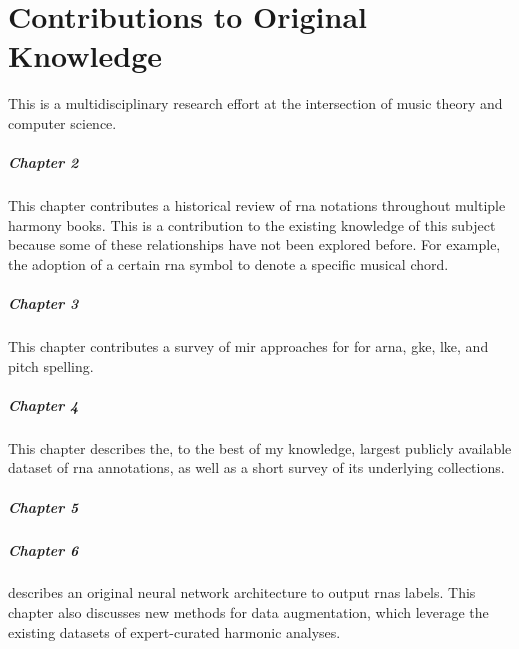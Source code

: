 \chapter*{Contributions to Original Knowledge}
\label{chap:contributionstoknowledge}

This \thesisdiss{} is a multidisciplinary research effort at
the intersection of music theory and computer science.

\paragraph{Chapter 2}

This chapter contributes a historical review of \gls{rna}
notations throughout multiple harmony books. This is a
contribution to the existing knowledge of this subject
because some of these relationships have not been explored
before. For example, the adoption of a certain \gls{rna}
symbol to denote a specific musical chord.

\paragraph{Chapter 3}

This chapter contributes a survey of \gls{mir} approaches
for for \gls{arna}, \gls{gke}, \gls{lke}, and pitch
spelling. 

\paragraph{Chapter 4}

This chapter describes the, to the best of my knowledge,
largest publicly available dataset of \gls{rna} annotations,
as well as a short survey of its underlying collections.

\paragraph{Chapter 5}
\paragraph{Chapter 6}




 describes an original neural network
architecture to output \glspl{rna} labels. This chapter also
discusses new methods for data augmentation, which leverage
the existing datasets of expert-curated harmonic analyses.
